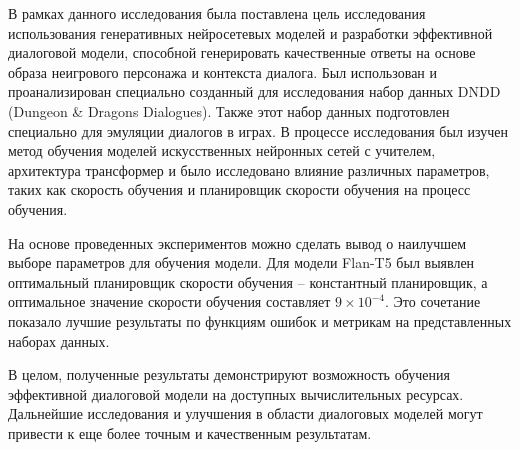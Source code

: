 В рамках данного исследования была поставлена цель исследования использования генеративных нейросетевых моделей и разработки эффективной диалоговой модели, способной генерировать качественные ответы на основе образа неигрового персонажа и контекста диалога. Был использован и проанализирован специально созданный для исследования набор данных DNDD (Dungeon \& Dragons Dialogues). Также этот набор данных подготовлен специально для эмуляции диалогов в играх. В процессе исследования был изучен метод обучения моделей искусственных нейронных сетей с учителем, архитектура трансформер и было исследовано влияние различных параметров, таких как скорость обучения и планировщик скорости обучения на процесс обучения.

На основе проведенных экспериментов можно сделать вывод о наилучшем выборе параметров для обучения модели. Для модели Flan-T5 был выявлен оптимальный планировщик скорости обучения -- константный планировщик, а оптимальное значение скорости обучения составляет $9 \times 10^{-4}$. Это сочетание показало лучшие результаты по функциям ошибок и метрикам на представленных наборах данных.

В целом, полученные результаты демонстрируют возможность обучения эффективной диалоговой модели на доступных вычислительных ресурсах. Дальнейшие исследования и улучшения в области диалоговых моделей могут привести к еще более точным и качественным результатам.